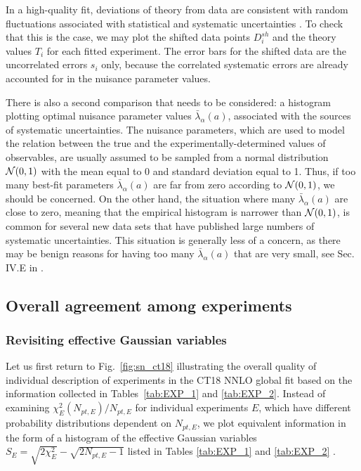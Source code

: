 In a high-quality fit, deviations of theory from data are consistent with random fluctuations associated with statistical and systematic uncertainties \cite{Kovarik:2019xvh}. To check that this is the case, we may
plot the shifted data points $D^\mathit{sh}_{i}$ and the theory values
$T_{i}$ for each fitted experiment. 
The error bars for the shifted data are the uncorrelated
errors $s_{i}$ only, because the correlated systematic errors are
already accounted for in the nuisance parameter values.  

There is
also a second comparison that needs to be considered: a histogram plotting
optimal nuisance parameter values $\bar \lambda_\alpha(a)$, associated
with the sources of systematic uncertainties.  The nuisance parameters, which are used to model the relation between the true and the experimentally-determined values of observables, are usually assumed to
be sampled from a normal distribution ${\cal N}(0,1)$ with the mean
equal to 0 and standard deviation equal to 1. Thus, if too many best-fit parameters $\bar \lambda_\alpha(a)$  are far from zero according to ${\cal N}(0,1)$, we should be concerned. On the other hand, the situation where many $\bar \lambda_\alpha(a)$ are close to zero, meaning that the empirical histogram is narrower than ${\cal N}(0,1)$, is common for several new data sets that have published large numbers of systematic uncertainties. This situation is generally less of a concern, as there may be benign reasons for having too many $\bar \lambda_\alpha(a)$ that are very small, see Sec. IV.E in \cite{Kovarik:2019xvh}. 


\subsection{Overall agreement among experiments \label{sec:QualityOverview}}

\subsubsection{Revisiting effective Gaussian variables}
Let us first return to Fig.~\ref{fig:sn_ct18} illustrating the overall quality of individual description of experiments in the CT18 NNLO global fit based on the information collected in Tables~\ref{tab:EXP_1} and \ref{tab:EXP_2}. 
Instead of examining $\chi^2_E(N_{pt,E})/N_{pt,E}$ for individual experiments $E$, which have different probability distributions dependent on $N_{pt,E}$, we plot equivalent information in the form of a histogram of the effective Gaussian variables $S_E=\sqrt{2\chi^2_E}-\sqrt{2N_{pt,E}-1}$ listed in Tables \ref{tab:EXP_1} and \ref{tab:EXP_2} \cite{Lai:2010vv}.

